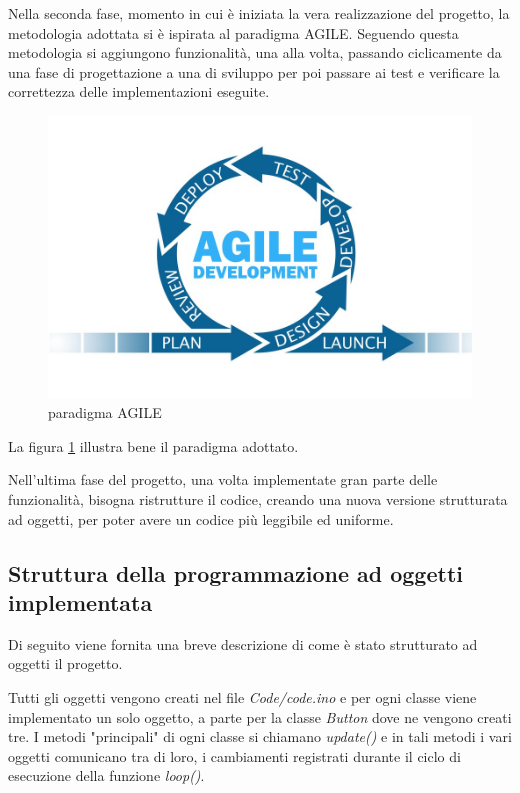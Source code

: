 \documentclass[paper=a4, fontsize=10pt]{scrartcl}
\begin{document}
Nella seconda fase, momento in cui è iniziata la vera realizzazione del progetto, la metodologia adottata si è ispirata al paradigma AGILE. Seguendo questa metodologia si aggiungono funzionalità, una alla volta, passando ciclicamente da una fase di progettazione a una di sviluppo per poi passare ai test e verificare la correttezza delle implementazioni eseguite.

\begin{figure}
  \includegraphics[scale=0.2]{AGILE.jpeg}
  \caption{paradigma AGILE}
  \label{fig:agile1}
\end{figure}
    
La figura \ref{fig:agile1}
illustra bene il paradigma adottato.


Nell'ultima fase del progetto, una volta implementate gran parte delle funzionalità, bisogna ristrutture il codice, creando una nuova versione strutturata ad oggetti, per poter avere un codice più leggibile ed uniforme.

\pagebreak

\subsection{Struttura della programmazione ad oggetti implementata}
Di seguito viene fornita una breve descrizione di come è stato strutturato ad oggetti il progetto.

Tutti gli oggetti vengono creati nel file \textit{Code/code.ino} e per ogni classe viene implementato un solo oggetto, a parte per la classe \textit{Button} dove ne vengono creati tre. I metodi "principali" di ogni classe si chiamano \textit{update()} e in tali metodi i vari oggetti comunicano tra di loro, i cambiamenti registrati durante il ciclo di esecuzione della funzione \textit{loop()}.
\end{document}
